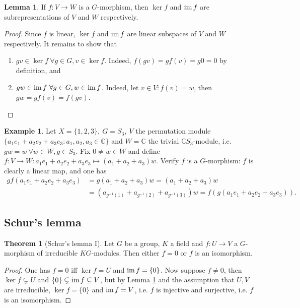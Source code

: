 \documentclass[a4paper]{article}
\newcommand{\C}{\mathbb{C}}
\newcommand{\im}{\text{im\,}}
\theoremstyle{definition}
\newtheorem{thm}[defn]{Theorem}
\newtheorem{lemma}[defn]{Lemma}
\newtheorem{example}[defn]{Example}
\begin{document}
\begin{lemma}
\label{lemma:kerimaresubrep}
If $f:V\rightarrow W$ is a $G$-morphism, then $\ker f$ and $\im f$ are subrepresentations of $V$ and $W$ respectively.
\end{lemma}
\begin{proof}
Since $f$ is linear, $\ker f$ and $\im f$ are linear subspaces of $V$ and $W$ respectively. It remains to show that
\begin{enumerate}
\item $gv\in\ker f \ \forall g\in G,v\in\ker f$. Indeed, $f(gv)=gf(v)=g0=0$ by definition, and
\item $gw\in\im f \ \forall g\in G,w\in\im f$. Indeed, let $v\in V:f(v)=w$, then $gw=gf(v)=f(gv)$.
\end{enumerate}
\end{proof}

\begin{example}
\label{example:S3perm}
Let $X=\{1,2,3\},\ G=S_3,\ V$ the permutation module $\{a_1e_1+a_2e_2+a_3e_3:a_1,a_2,a_3\in\C\}$ and $W=\C$ the trivial $\C S_3$-module, i.e. $gw=w \ \forall w\in W,g\in S_3$. Fix $0\neq w\in W$ and define $f:V\rightarrow W:a_1e_1+a_2e_2+a_3e_3\mapsto (a_1+a_2+a_3)w$. Verify $f$ is a $G$-morphism: $f$ is clearly a linear map, and one has
\[
\begin{aligned}
gf(a_1e_1+a_2e_2+a_3e_3)&=g(a_1+a_2+a_3)w=(a_1+a_2+a_3)w\\
&=\left(a_{g^{-1}(1)}+a_{g^{-1}(2)}+a_{g^{-1}(3)}\right)w=f(g(a_1e_1+a_2e_2+a_3e_3)).
\end{aligned}
\]
\end{example}

\subsection{Schur's lemma}
\begin{thm}[Schur's lemma I]
\label{thm:SchurslemmaI}
Let $G$ be a group, $K$ a field and $f:U\rightarrow V$ a $G$-morphism of irreducible $KG$-modules. Then either $f=0$ or $f$ is an isomorphism.
\end{thm}
\begin{proof}
One has $f=0$ iff $\ker f=U$ and $\im f=\{0\}$. Now suppose $f\neq 0$, then $\ker f\subsetneq U$ and $\{0\}\subsetneq \im f\subseteq V$, but by Lemma \ref{lemma:kerimaresubrep} and the assumption that $U,V$ are irreducible, $\ker f=\{0\}$ and $\im f=V$, i.e. $f$ is injective and surjective, i.e. $f$ is an isomorphism.
\end{proof}
\end{document}
